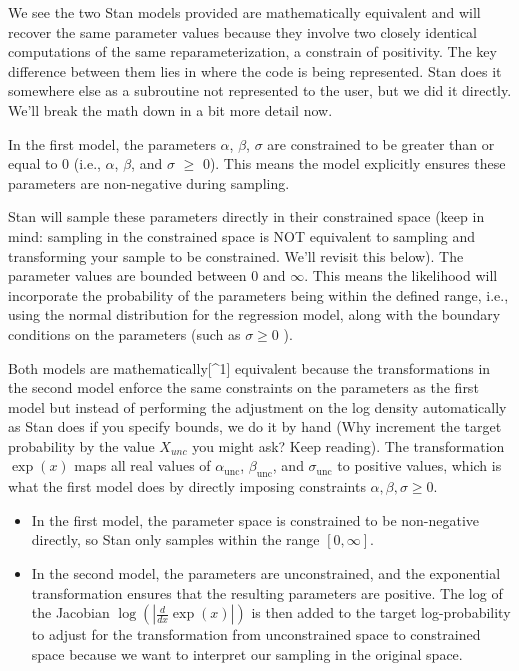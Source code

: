 \documentclass[
  letterpaper,
  DIV=11,
  numbers=noendperiod]{scrartcl}
\providecommand{\tightlist}{%
  \setlength{\itemsep}{0pt}\setlength{\parskip}{0pt}}\usepackage{longtable,booktabs,array}
\begin{document}
We see the two Stan models provided are mathematically equivalent and
will recover the same parameter values because they involve two closely
identical computations of the same reparameterization, a constrain of
positivity. The key difference between them lies in where the code is
being represented. Stan does it somewhere else as a subroutine not
represented to the user, but we did it directly. We'll break the math
down in a bit more detail now.

In the first model, the parameters \(\alpha\), \(\beta\), \(\sigma\) are
constrained to be greater than or equal to 0 (i.e., \(\alpha\),
\(\beta\), and \(\sigma\) \(\geq\) \(0\)). This means the model
explicitly ensures these parameters are non-negative during sampling.

Stan will sample these parameters directly in their constrained space
(keep in mind: sampling in the constrained space is NOT equivalent to
sampling and transforming your sample to be constrained. We'll revisit
this below). The parameter values are bounded between \(0\) and
\(\infty\). This means the likelihood will incorporate the probability
of the parameters being within the defined range, i.e., using the normal
distribution for the regression model, along with the boundary
conditions on the parameters (such as \(\sigma \geq 0\) ).

Both models are mathematically{[}\^{}1{]} equivalent because the
transformations in the second model enforce the same constraints on the
parameters as the first model but instead of performing the adjustment
on the log density automatically as Stan does if you specify bounds, we
do it by hand (Why increment the target probability by the value
\(X_{unc}\) you might ask? Keep reading). The transformation \(\exp(x)\)
maps all real values of \(\alpha_{\text{unc}}\), \(\beta_{\text{unc}}\),
and \(\sigma_{\text{unc}}\) to positive values, which is what the first
model does by directly imposing constraints
\(\alpha, \beta, \sigma \geq 0\).

\begin{itemize}
\tightlist
\item
  In the first model, the parameter space is constrained to be
  non-negative directly, so Stan only samples within the range
  \([0, \infty]\).
\item
  In the second model, the parameters are unconstrained, and the
  exponential transformation ensures that the resulting parameters are
  positive. The log of the Jacobian
  \(\log \left( \left| \frac{d}{dx} \exp(x) \right| \right)\) is then
  added to the target log-probability to adjust for the transformation
  from unconstrained space to constrained space because we want to
  interpret our sampling in the original space.
\end{itemize}
\end{document}
